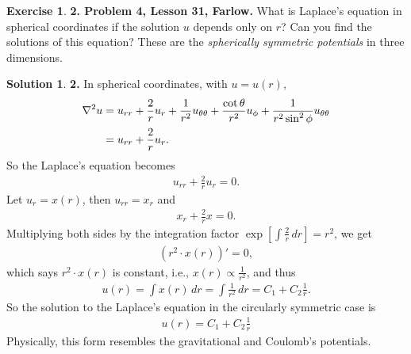 \documentclass{book}
\theoremstyle{definition}
\newtheorem*{exer*}{Exercise}
\newtheorem*{sln*}{Solution}
\newcommand{\f}[2]{\frac{#1}{#2}}
\newcommand{\lb}{\left[}
\newcommand{\rb}{\right]}
\begin{document}
\begin{exer*}\textbf{2. Problem 4, Lesson 31, Farlow.} What is Laplace's equation in spherical coordinates if the solution $u$ depends only on $r$? Can you find the solutions of this equation? These are the \textit{spherically symmetric potentials} in three dimensions.
	
	\begin{sln*}\textbf{2.} In spherical coordinates, with $u = u(r)$,
		\begin{align*}
		\laplacian u &= u_{rr} + \f{2}{r}u_r + \f{1}{r^2}u_{\theta\theta} + \f{\cot\theta}{r^2}u_\phi + \f{1}{r^2\sin^2\phi}u_{\theta\theta}\\
		&= u_{rr} + \f{2}{r}u_r.
		\end{align*}
		So the Laplace's equation becomes
		\begin{align*}
		u_{rr} + \f{2}{r}u_r = 0.
		\end{align*}
		Let $u_r = x(r)$, then $u_{rr} = x_r$ and
		\begin{align*}
		x_r + \f{2}{r}x = 0.
		\end{align*}
		Multiplying both sides by the integration factor $\exp\lb \int \f{2}{r}\,dr \rb = r^2$, we get
		\begin{align*}
		(r^2 \cdot x(r))' = 0,
		\end{align*}
		which says $r^2 \cdot x(r)$ is constant, i.e., $x(r) \propto \f{1}{r^2}$, and thus
		\begin{align*}
		u(r) = \int x(r)\,dr = \int \f{1}{r^2}\,dr = C_1 + C_2 \f{1}{r}.
		\end{align*}
		So the solution to the Laplace's equation in the circularly symmetric case is
		\begin{align*}
		\boxed{u(r) = C_1 + C_2 \f{1}{r}}
		\end{align*}
		Physically, this form resembles the gravitational and Coulomb's potentials.
		
	\end{sln*}
\end{exer*}




\newpage
\end{document}
